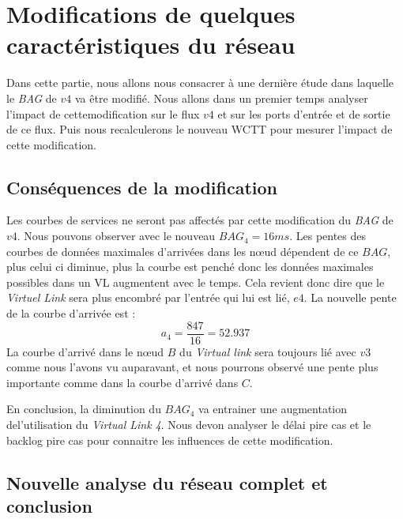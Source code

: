 \chapter{Modifications de quelques caractéristiques du réseau}
Dans cette partie, nous allons nous consacrer à une dernière étude dans laquelle le \emph{BAG} de $v4$ va être modifié. Nous allons dans un premier temps analyser l'impact de cettemodification sur le flux $v4$ et sur les ports d'entrée et de sortie de ce flux. Puis nous recalculerons le nouveau WCTT pour mesurer l'impact de cette modification.

\section{Conséquences de la modification}
Les courbes de services ne seront pas affectés par cette modification du \emph{BAG} de $v4$. Nous pouvons observer avec le nouveau $BAG_4 = 16ms$. Les pentes des courbes de données maximales d'arrivées dans les nœud dépendent de ce $BAG$, plus celui ci diminue, plus la courbe est penché donc les données maximales possibles dans un VL augmentent avec le temps. Cela revient donc  dire que le \emph{Virtuel Link} sera plus encombré par l'entrée qui lui est lié, $e4$. La nouvelle pente de la courbe d'arrivée est :
\begin{equation}
a_4 = \frac{847}{16} = 52.937
\end{equation}
La courbe d'arrivé dans le nœud $B$ du \emph{Virtual link} sera toujours lié avec $v3$ comme nous l'avons vu auparavant, et nous pourrons observé une pente plus importante comme dans la courbe d'arrivé dans $C$. 

En conclusion, la diminution du $BAG_4$ va entrainer une augmentation del'utilisation du \emph{Virtual Link 4}. Nous devon analyser le délai pire cas et le backlog pire cas pour connaitre les influences de cette modification.

\section{Nouvelle analyse du réseau complet et conclusion} 


